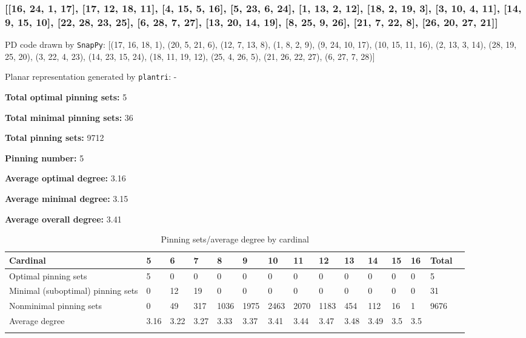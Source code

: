 \documentclass{article}%
\begin{document}
\newpage

\subsubsection{[[16, 24, 1, 17], [17, 12, 18, 11], [4, 15, 5, 16], [5, 23, 6, 24], [1, 13, 2, 12], [18, 2, 19, 3], [3, 10, 4, 11], [14, 9, 15, 10], [22, 28, 23, 25], [6, 28, 7, 27], [13, 20, 14, 19], [8, 25, 9, 26], [21, 7, 22, 8], [26, 20, 27, 21]]}

{\small\noindent PD code drawn by \texttt{SnapPy}: [(17, 16, 18, 1), (20, 5, 21, 6), (12, 7, 13, 8), (1, 8, 2, 9), (9, 24, 10, 17), (10, 15, 11, 16), (2, 13, 3, 14), (28, 19, 25, 20), (3, 22, 4, 23), (14, 23, 15, 24), (18, 11, 19, 12), (25, 4, 26, 5), (21, 26, 22, 27), (6, 27, 7, 28)]}

{\small\noindent Planar representation generated by \texttt{plantri}: -}

\begin{multicols}{2}
{\normalsize \noindent\textbf{Total optimal pinning sets:} 5

\noindent\textbf{Total minimal pinning sets:} 36

\noindent\textbf{Total pinning sets:} 9712

\noindent\textbf{Pinning number:} 5

}
\columnbreak

{\normalsize \noindent\textbf{Average optimal degree:} 3.16

\noindent\textbf{Average minimal degree:} 3.15

\noindent\textbf{Average overall degree:} 3.41

}
\end{multicols}

\begin{table}[ht]
	\caption{Pinning sets/average degree by cardinal}
	\centering
	\renewcommand{\arraystretch}{1.5}
	\begin{tabularx}{\textwidth}{lXXXXXXXXXXXXXX}
		\toprule
			Cardinal & 5 & 6 & 7 & 8 & 9 & 10 & 11 & 12 & 13 & 14 & 15 & 16 & Total\\
			\hline
			Optimal pinning sets & 5 & 0 & 0 & 0 & 0 & 0 & 0 & 0 & 0 & 0 & 0 & 0 & 5 \\
			Minimal (suboptimal) pinning sets & 0 & 12 & 19 & 0 & 0 & 0 & 0 & 0 & 0 & 0 & 0 & 0 & 31 \\
			Nonminimal pinning sets & 0 & 49 & 317 & 1036 & 1975 & 2463 & 2070 & 1183 & 454 & 112 & 16 & 1 & 9676 \\
			Average degree & 3.16 & 3.22 & 3.27 & 3.33 & 3.37 & 3.41 & 3.44 & 3.47 & 3.48 & 3.49 & 3.5 & 3.5 &  \\
		\bottomrule \\ 
	\end{tabularx}
\end{table}
\end{document}
